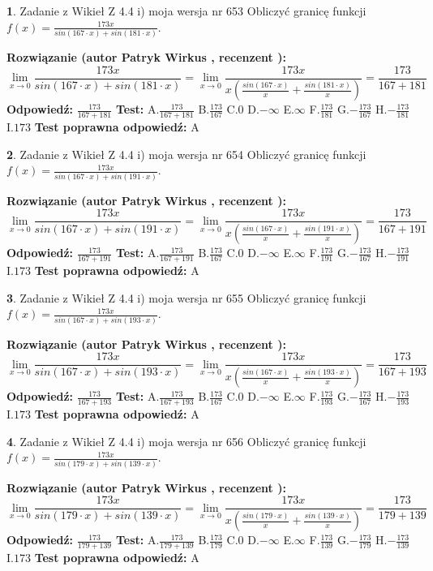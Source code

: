 \documentclass[12pt, a4paper]{article}
\theoremstyle{definition} %
\newtheorem{zad}{}
\newcommand{\zadStart}[1]{\begin{zad}#1\newline}
\newcommand{\zadStop}{\end{zad}}
\newcommand{\rozwStart}[2]{\noindent \textbf{Rozwiązanie (autor #1 , recenzent #2): }\newline}
\newcommand{\rozwStop}{\newline}
\newcommand{\odpStart}{\noindent \textbf{Odpowiedź:}\newline}
\newcommand{\odpStop}{\newline}
\newcommand{\testStart}{\noindent \textbf{Test:}\newline}
\newcommand{\testStop}{\newline}
\newcommand{\kluczStart}{\noindent \textbf{Test poprawna odpowiedź:}\newline}
\newcommand{\kluczStop}{\newline}
\begin{document}
\zadStart{Zadanie z Wikieł Z 4.4 i) moja wersja nr 653}
Obliczyć granicę funkcji $f(x)=\frac{173x}{sin(167\cdot x) +sin(181\cdot x)}$.
\zadStop
\rozwStart{Patryk Wirkus}{}
$$\lim\limits_{x\to 0}\frac{173x}{sin(167\cdot x) +sin(181\cdot x)}=\lim\limits_{x\to 0}\frac{173x}{x(\frac{sin(167\cdot x)}{x}+\frac{sin(181\cdot x)}{x})}=\frac{173}{167+181}$$
\rozwStop
\odpStart
$\frac{173}{167+181}$
\odpStop
\testStart
A.$\frac{173}{167+181}$
B.$\frac{173}{167}$
C.$0$
D.$-\infty$
E.$\infty$
F.$\frac{173}{181}$
G.$-\frac{173}{167}$
H.$-\frac{173}{181}$
I.$173$
\testStop
\kluczStart
A
\kluczStop



\zadStart{Zadanie z Wikieł Z 4.4 i) moja wersja nr 654}
Obliczyć granicę funkcji $f(x)=\frac{173x}{sin(167\cdot x) +sin(191\cdot x)}$.
\zadStop
\rozwStart{Patryk Wirkus}{}
$$\lim\limits_{x\to 0}\frac{173x}{sin(167\cdot x) +sin(191\cdot x)}=\lim\limits_{x\to 0}\frac{173x}{x(\frac{sin(167\cdot x)}{x}+\frac{sin(191\cdot x)}{x})}=\frac{173}{167+191}$$
\rozwStop
\odpStart
$\frac{173}{167+191}$
\odpStop
\testStart
A.$\frac{173}{167+191}$
B.$\frac{173}{167}$
C.$0$
D.$-\infty$
E.$\infty$
F.$\frac{173}{191}$
G.$-\frac{173}{167}$
H.$-\frac{173}{191}$
I.$173$
\testStop
\kluczStart
A
\kluczStop



\zadStart{Zadanie z Wikieł Z 4.4 i) moja wersja nr 655}
Obliczyć granicę funkcji $f(x)=\frac{173x}{sin(167\cdot x) +sin(193\cdot x)}$.
\zadStop
\rozwStart{Patryk Wirkus}{}
$$\lim\limits_{x\to 0}\frac{173x}{sin(167\cdot x) +sin(193\cdot x)}=\lim\limits_{x\to 0}\frac{173x}{x(\frac{sin(167\cdot x)}{x}+\frac{sin(193\cdot x)}{x})}=\frac{173}{167+193}$$
\rozwStop
\odpStart
$\frac{173}{167+193}$
\odpStop
\testStart
A.$\frac{173}{167+193}$
B.$\frac{173}{167}$
C.$0$
D.$-\infty$
E.$\infty$
F.$\frac{173}{193}$
G.$-\frac{173}{167}$
H.$-\frac{173}{193}$
I.$173$
\testStop
\kluczStart
A
\kluczStop



\zadStart{Zadanie z Wikieł Z 4.4 i) moja wersja nr 656}
Obliczyć granicę funkcji $f(x)=\frac{173x}{sin(179\cdot x) +sin(139\cdot x)}$.
\zadStop
\rozwStart{Patryk Wirkus}{}
$$\lim\limits_{x\to 0}\frac{173x}{sin(179\cdot x) +sin(139\cdot x)}=\lim\limits_{x\to 0}\frac{173x}{x(\frac{sin(179\cdot x)}{x}+\frac{sin(139\cdot x)}{x})}=\frac{173}{179+139}$$
\rozwStop
\odpStart
$\frac{173}{179+139}$
\odpStop
\testStart
A.$\frac{173}{179+139}$
B.$\frac{173}{179}$
C.$0$
D.$-\infty$
E.$\infty$
F.$\frac{173}{139}$
G.$-\frac{173}{179}$
H.$-\frac{173}{139}$
I.$173$
\testStop
\kluczStart
A
\kluczStop
\end{document}
